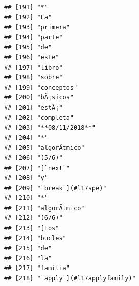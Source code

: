 \documentclass[
]{book}
\begin{document}
\begin{verbatim}
## [191] "*"                                                                                
## [192] "La"                                                                               
## [193] "primera"                                                                          
## [194] "parte"                                                                            
## [195] "de"                                                                               
## [196] "este"                                                                             
## [197] "libro"                                                                            
## [198] "sobre"                                                                            
## [199] "conceptos"                                                                        
## [200] "bÃ¡sicos"                                                                         
## [201] "estÃ¡"                                                                            
## [202] "completa"                                                                         
## [203] "**08/11/2018**"                                                                   
## [204] "*"                                                                                
## [205] "algorÃ­tmico"                                                                     
## [206] "(5/6)"                                                                            
## [207] "[`next`"                                                                          
## [208] "y"                                                                                
## [209] "`break`](#l17spe)"                                                                
## [210] "*"                                                                                
## [211] "algorÃ­tmico"                                                                     
## [212] "(6/6)"                                                                            
## [213] "[Los"                                                                             
## [214] "bucles"                                                                           
## [215] "de"                                                                               
## [216] "la"                                                                               
## [217] "familia"                                                                          
## [218] "`apply`](#l17applyfamily)"                                                        

\end{verbatim}
\end{document}
